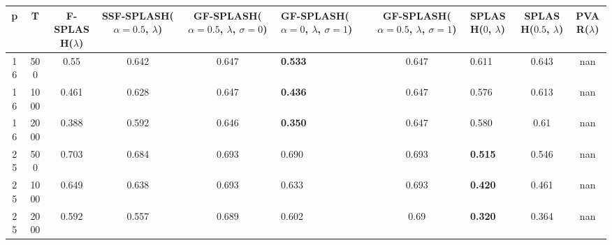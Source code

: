 \begin{tabular}{ccccclclcc}
\hline
  p  &  T   &  F-SPLASH($\lambda$)  &  SSF-SPLASH($\alpha=0.5$, $\lambda$)  &  GF-SPLASH($\alpha=0.5$, $\lambda$, $\sigma=0$)  & GF-SPLASH($\alpha=0$, $\lambda$, $\sigma=1$)   &  GF-SPLASH($\alpha=0.5$, $\lambda$, $\sigma=1$)  & SPLASH($0$, $\lambda$)   &  SPLASH($0.5$, $\lambda$)  &  PVAR($\lambda$)  \\
\hline
 16  & 500  &         0.55          &                 0.642                 &                      0.647                       & \textbf{0.533}                                 &                      0.647                       & 0.611                    &           0.643            &        nan        \\
 16  & 1000 &         0.461         &                 0.628                 &                      0.647                       & \textbf{0.436}                                 &                      0.647                       & 0.576                    &           0.613            &        nan        \\
 16  & 2000 &         0.388         &                 0.592                 &                      0.646                       & \textbf{0.350}                                 &                      0.647                       & 0.580                    &            0.61            &        nan        \\
 25  & 500  &         0.703         &                 0.684                 &                      0.693                       & 0.690                                          &                      0.693                       & \textbf{0.515}           &           0.546            &        nan        \\
 25  & 1000 &         0.649         &                 0.638                 &                      0.693                       & 0.633                                          &                      0.693                       & \textbf{0.420}           &           0.461            &        nan        \\
 25  & 2000 &         0.592         &                 0.557                 &                      0.689                       & 0.602                                          &                       0.69                       & \textbf{0.320}           &           0.364            &        nan        \\
\hline
\end{tabular}
